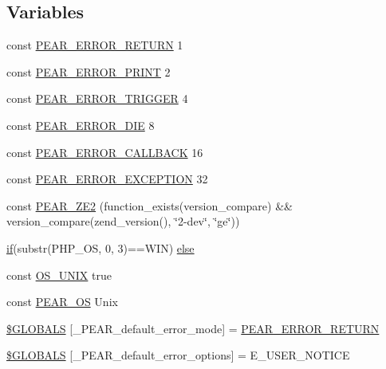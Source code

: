 \subsection*{Variables}
\begin{DoxyCompactItemize}
\item 
const \hyperlink{PEAR_8php_a90d8915cb5b94d81cd4e1efa9c75c66a}{P\+E\+A\+R\+\_\+\+E\+R\+R\+O\+R\+\_\+\+R\+E\+T\+U\+RN} 1
\item 
const \hyperlink{PEAR_8php_a0e3a03600a1f06a1dbbddd0914b9f794}{P\+E\+A\+R\+\_\+\+E\+R\+R\+O\+R\+\_\+\+P\+R\+I\+NT} 2
\item 
const \hyperlink{PEAR_8php_a23a071419e1d6bbb554976e21d978d56}{P\+E\+A\+R\+\_\+\+E\+R\+R\+O\+R\+\_\+\+T\+R\+I\+G\+G\+ER} 4
\item 
const \hyperlink{PEAR_8php_ad34f61c0049eae3d64aca2ad2e6003ab}{P\+E\+A\+R\+\_\+\+E\+R\+R\+O\+R\+\_\+\+D\+IE} 8
\item 
const \hyperlink{PEAR_8php_ad1780c583741d97d9a2b3077516744af}{P\+E\+A\+R\+\_\+\+E\+R\+R\+O\+R\+\_\+\+C\+A\+L\+L\+B\+A\+CK} 16
\item 
const \hyperlink{PEAR_8php_abef10fde628fe54cde4cf2e86f04e4dc}{P\+E\+A\+R\+\_\+\+E\+R\+R\+O\+R\+\_\+\+E\+X\+C\+E\+P\+T\+I\+ON} 32
\item 
const \hyperlink{PEAR_8php_a16b6fef5a6547779f3d9d6e1b7c5c2b5}{P\+E\+A\+R\+\_\+\+Z\+E2} (function\+\_\+exists(\textquotesingle{}version\+\_\+compare\textquotesingle{}) \&\& version\+\_\+compare(zend\+\_\+version(), \char`\"{}2-\/dev\char`\"{}, \char`\"{}ge\char`\"{}))
\item 
\hyperlink{config_8inc_8php_a73b98c0274e28635a594091f9ca43cb4}{if}(substr(P\+H\+P\+\_\+\+OS, 0, 3)==\textquotesingle{}W\+IN\textquotesingle{}) \hyperlink{PEAR_8php_af24a9448efffb54f4dc053b72ea934c1}{else}
\item 
const \hyperlink{PEAR_8php_aac9eed8b1212799624da961df2b7469f}{O\+S\+\_\+\+U\+N\+IX} true
\item 
const \hyperlink{PEAR_8php_a5fd2c8f5bc659f777ab39b8bfd745c4c}{P\+E\+A\+R\+\_\+\+OS} \textquotesingle{}Unix\textquotesingle{}
\item 
\hyperlink{PEAR_8php_afebfe34c0ac29a64ce790889963af69a}{\$\+G\+L\+O\+B\+A\+LS} \mbox{[}\textquotesingle{}\+\_\+\+P\+E\+A\+R\+\_\+default\+\_\+error\+\_\+mode\textquotesingle{}\mbox{]} = \hyperlink{PEAR_8php_a90d8915cb5b94d81cd4e1efa9c75c66a}{P\+E\+A\+R\+\_\+\+E\+R\+R\+O\+R\+\_\+\+R\+E\+T\+U\+RN}
\item 
\hyperlink{PEAR_8php_a3988e90ac34a67556963d6e44d87d1a6}{\$\+G\+L\+O\+B\+A\+LS} \mbox{[}\textquotesingle{}\+\_\+\+P\+E\+A\+R\+\_\+default\+\_\+error\+\_\+options\textquotesingle{}\mbox{]} = E\+\_\+\+U\+S\+E\+R\+\_\+\+N\+O\+T\+I\+CE

\end{DoxyCompactItemize}
